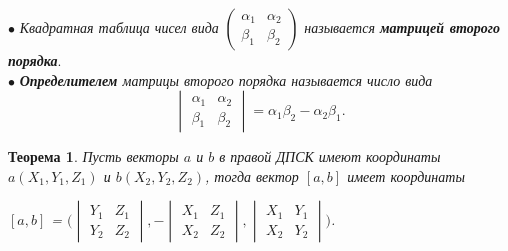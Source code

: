 $\bullet$ \textit{Квадратная таблица чисел вида} $\begin{pmatrix} \alpha_1 & \alpha_2 \\ \beta_1 & \beta_2 \end{pmatrix}$ \textit{называется \textbf{матрицей второго порядка}}. \\
$\bullet$ \textit{\textbf{Определителем} матрицы второго порядка называется число вида} $$\begin{vmatrix} \alpha_1 & \alpha_2 \\ \beta_1 & \beta_2 \end{vmatrix} = \alpha_1\beta_2 - \alpha_2\beta_1.$$
\newtheorem*{t3_5_1}{Теорема}\begin{t3_5_1} Пусть векторы $a$ и $b$ в правой ДПСК имеют координаты $a (X_1, Y_1, Z_1)$ и $b (X_2, Y_2, Z_2)$, тогда вектор $[a, b]$ имеет координаты\begin{center}
		$[a, b]$ =  $\Bigg( \begin{vmatrix} Y_1 & Z_1 \\ Y_2 & Z_2 \end{vmatrix}, - \begin{vmatrix} X_1 & Z_1 \\ X_2 & Z_2 \end{vmatrix}, \begin{vmatrix} X_1 & Y_1 \\ X_2 & Y_2 \end{vmatrix} \Bigg)$.
	\end{center}
\end{t3_5_1}
